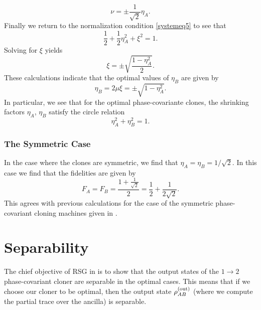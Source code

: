 \documentclass[reqno]{amsart}
\numberwithin{lemma}{section}
\numberwithin{proposition}{section}
\newcommand{\out}{\textnormal{out}}
\begin{document}
{\begin{equation*}
\nu = \pm \frac{1}{\sqrt{2}} \eta_{A}.
\end{equation*}
Finally we return to the normalization condition \eqref{systemeq5} to see that
\begin{equation*}
\frac{1}{2} + \frac{1}{2} \eta_{A}^{2} + \xi^{2} = 1.
\end{equation*}
Solving for $\xi$ yields
\begin{equation*}
\xi = \pm \sqrt{\frac{1 - \eta_{A}^{2}}{2}}.
\end{equation*}
These calculations indicate that the optimal values of $\eta_{B}$ are given by
\begin{equation*}
\eta_{B} = 2 \mu \xi = \pm \sqrt{1 - \eta_{A}^{2}}.
\end{equation*}
In particular, we see that for the optimal phase-covariante clones, the shrinking factors $\eta_{A}$, $\eta_{B}$ satisfy the circle relation
\begin{equation*}
\eta_{A}^{2} + \eta_{B}^{2} = 1.
\end{equation*}

\subsubsection{The Symmetric Case} In the case where the clones are symmetric, we find that $\eta_{A} = \eta_{B} = 1/\sqrt{2}$. In this case we find that the fidelities are given by
\begin{equation*}
F_{A} = F_{B} = \frac{1 + \frac{1}{\sqrt{2}}}{2} = \frac{1}{2} + \frac{1}{2\sqrt{2}}.
\end{equation*}
This agrees with previous calculations for the case of the symmetric phase-covariant cloning machines given in \cite{fan2001quantum}.



\section{Separability}
The chief objective of RSG in \cite{REZAKHANI2005278} is to show that the output states of the $1 \to 2$ phase-covariant cloner are separable in the optimal cases. This means that if we choose our cloner to be optimal, then the output state $\rho_{AB}^{(\out)}$ (where we compute the partial trace over the ancilla) is separable.

}
\end{document}
